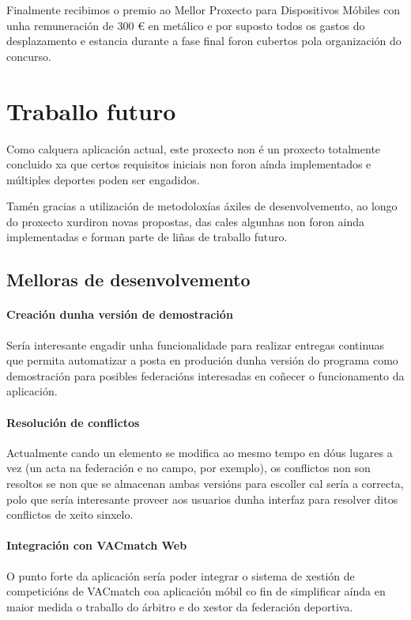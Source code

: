   Finalmente recibimos o premio ao Mellor Proxecto para Dispositivos Móbiles 
con unha remuneración de 300 \euro{} en metálico e por suposto todos os gastos 
do desplazamento e estancia durante a fase final foron cubertos pola 
organización do concurso.

\section{Traballo futuro}
Como calquera aplicación actual, este proxecto non é un proxecto totalmente 
concluido xa que certos requisitos iniciais non foron aínda implementados e 
múltiples deportes poden ser engadidos.

Tamén gracias a utilización de metodoloxías áxiles de desenvolvemento, ao 
longo do proxecto xurdiron novas propostas, das cales algunhas non foron 
ainda implementadas e forman parte de liñas de traballo futuro.

  \subsection{Melloras de desenvolvemento}

    \paragraph{Creación dunha versión de demostración} Sería interesante 
engadir unha funcionalidade para realizar entregas continuas que permita 
automatizar a posta en produción dunha versión do programa como demostración 
para posibles federacións interesadas en coñecer o funcionamento da aplicación.

    \paragraph{Resolución de conflictos} Actualmente cando un elemento se 
modifica ao mesmo tempo en dóus lugares a vez (un acta na federación e no 
campo, por exemplo), os conflictos non son resoltos se non que se almacenan 
ambas versións para escoller cal sería a correcta, polo que sería interesante 
proveer aos usuarios dunha interfaz para resolver ditos conflictos de xeito 
sinxelo.

    \paragraph{Integración con VACmatch Web} O punto forte da aplicación sería 
poder integrar o sistema de xestión de competicións de VACmatch coa aplicación 
móbil co fin de simplificar aínda en maior medida o traballo do árbitro e do 
xestor da federación deportiva. 

